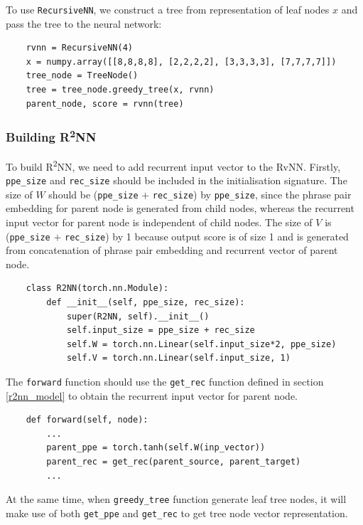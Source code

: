 \documentclass[12pt,a4paper,twoside,openright]{report}
\begin{document}
To use \texttt{RecursiveNN}, we construct a tree from representation of leaf nodes $x$ and pass the tree to the neural network:

\begin{verbatim}
    rvnn = RecursiveNN(4)
    x = numpy.array([[8,8,8,8], [2,2,2,2], [3,3,3,3], [7,7,7,7]])
    tree_node = TreeNode()
    tree = tree_node.greedy_tree(x, rvnn)
    parent_node, score = rvnn(tree)
\end{verbatim}


\subsubsection{Building \texorpdfstring{R\textsuperscript{2}NN}{R2NN}}
To build R\textsuperscript{2}NN, we need to add recurrent input vector to the RvNN. Firstly, \texttt{ppe\_size} and \texttt{rec\_size} should be included in the initialisation signature. The size of $W$ should be (\texttt{ppe\_size} $+$ \texttt{rec\_size}) by \texttt{ppe\_size}, since the phrase pair embedding for parent node is generated from child nodes, whereas the recurrent input vector for parent node is independent of child nodes. The size of $V$ is (\texttt{ppe\_size} $+$ \texttt{rec\_size}) by 1 because output score is of size 1 and is generated from concatenation of phrase pair embedding and recurrent vector of parent node.

\begin{verbatim}
    class R2NN(torch.nn.Module):
        def __init__(self, ppe_size, rec_size):
            super(R2NN, self).__init__()
            self.input_size = ppe_size + rec_size
            self.W = torch.nn.Linear(self.input_size*2, ppe_size)
            self.V = torch.nn.Linear(self.input_size, 1)
\end{verbatim}

The \texttt{forward} function should use the \texttt{get\_rec} function defined in section \ref{r2nn_model} to obtain the recurrent input vector for parent node.

\begin{verbatim}
    def forward(self, node):
        ...
        parent_ppe = torch.tanh(self.W(inp_vector))
        parent_rec = get_rec(parent_source, parent_target)
        ...
\end{verbatim}

At the same time, when \texttt{greedy\_tree} function generate leaf tree nodes, it will make use of both \texttt{get\_ppe} and \texttt{get\_rec} to get tree node vector representation.
\end{document}

